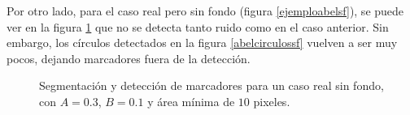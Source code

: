 Por otro lado, para el caso real pero sin fondo (figura \ref{ejemploabelsf}), se puede ver en la figura \ref{ejemploabel} que no se detecta tanto ruido como en el caso anterior. Sin embargo, los círculos detectados en la figura \ref{abelcirculossf} vuelven a ser muy pocos, dejando marcadores fuera de la detección.

\begin{figure}[H]
        \centering
        \hspace{5 mm}
  \caption{Segmentación y detección de marcadores para un caso real sin fondo, con $A=0.3$, $B=0.1$ y área mínima de $10$ pixeles.}
      \label{ejemploabel}
\end{figure}

